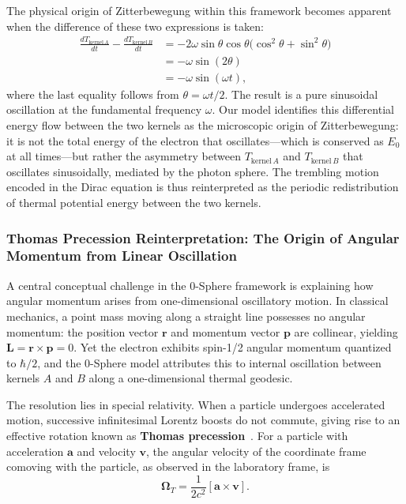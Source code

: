 \documentclass[12pt,letterpaper]{article}
\begin{document}
The physical origin of Zitterbewegung within this framework becomes apparent when the difference of these two expressions is taken:
\begin{align}
  \frac{dT_{\mathrm{kernel}\,A}}{dt} - \frac{dT_{\mathrm{kernel}\,B}}{dt}
  &= -2\omega\sin\theta\cos\theta\bigl(\cos^2\theta + \sin^2\theta\bigr) \\
  &= -\omega\sin(2\theta) \\
  &= -\omega\sin(\omega t),
\end{align}
where the last equality follows from $\theta = \omega t/2$. The result is a pure sinusoidal oscillation at the fundamental frequency $\omega$. Our model identifies this differential energy flow between the two kernels as the microscopic origin of Zitterbewegung: it is not the total energy of the electron that oscillates---which is conserved as $E_0$ at all times---but rather the asymmetry between $T_{\mathrm{kernel}\,A}$ and $T_{\mathrm{kernel}\,B}$ that oscillates sinusoidally, mediated by the photon sphere. The trembling motion encoded in the Dirac equation is thus reinterpreted as the periodic redistribution of thermal potential energy between the two kernels.

\subsubsection{Thomas Precession Reinterpretation: The Origin of Angular Momentum from Linear Oscillation}
\label{subsubsec:thomas_reinterpretation}

A central conceptual challenge in the 0-Sphere framework is explaining how angular momentum arises from one-dimensional oscillatory motion. In classical mechanics, a point mass moving along a straight line possesses no angular momentum: the position vector $\bm{r}$ and momentum vector $\bm{p}$ are collinear, yielding $\bm{L} = \bm{r} \times \bm{p} = 0$. Yet the electron exhibits spin-1/2 angular momentum quantized to $\hbar/2$, and the 0-Sphere model attributes this to internal oscillation between kernels $A$ and $B$ along a one-dimensional thermal geodesic.

The resolution lies in special relativity. When a particle undergoes accelerated motion, successive infinitesimal Lorentz boosts do not commute, giving rise to an effective rotation known as \textbf{Thomas precession}~\cite{hanamura17764997}. For a particle with acceleration $\bm{a}$ and velocity $\bm{v}$, the angular velocity of the coordinate frame comoving with the particle, as observed in the laboratory frame, is
\begin{equation}
\bm{\Omega}_T = \frac{1}{2c^2} [\bm{a} \times \bm{v}].
\label{eq:thomas_precession_general}
\end{equation}
\end{document}
